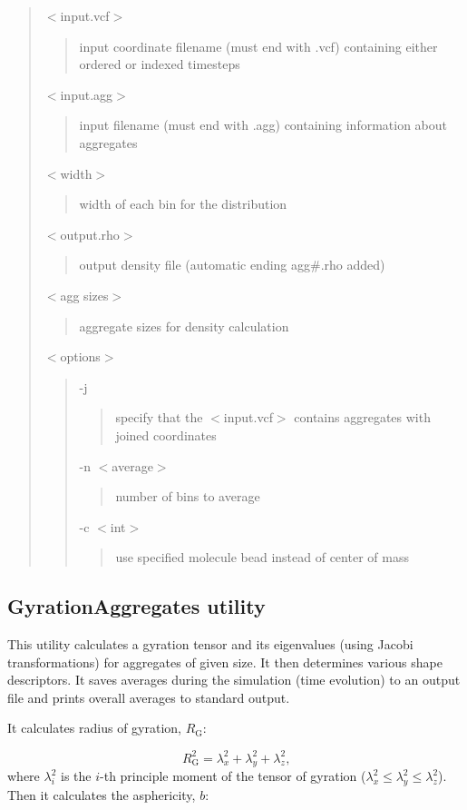 \begin{quote}
{\ttfamily $<$input.\+vcf$>$} \begin{quote}
input coordinate filename (must end with {\ttfamily .vcf}) containing either ordered or indexed timesteps \end{quote}
{\ttfamily $<$input.\+agg$>$} \begin{quote}
input filename (must end with {\ttfamily .agg}) containing information about aggregates \end{quote}
{\ttfamily $<$width$>$} \begin{quote}
width of each bin for the distribution \end{quote}
{\ttfamily $<$output.\+rho$>$} \begin{quote}
output density file (automatic ending {\ttfamily agg\#.rho} added) \end{quote}
{\ttfamily $<$agg sizes$>$} \begin{quote}
aggregate sizes for density calculation \end{quote}
{\ttfamily $<$options$>$} \begin{quote}
{\ttfamily -\/j} \begin{quote}
specify that the {\ttfamily $<$input.\+vcf$>$} contains aggregates with joined coordinates \end{quote}
{\ttfamily -\/n $<$average$>$} \begin{quote}
number of bins to average \end{quote}
{\ttfamily -\/c $<$int$>$} \begin{quote}
use specified molecule bead instead of center of mass \end{quote}
\end{quote}
\end{quote}
\hypertarget{Common_GyrationAggregates}{}\subsection{Gyration\+Aggregates utility}\label{Common_GyrationAggregates}
This utility calculates a gyration tensor and its eigenvalues (using Jacobi transformations) for aggregates of given size. It then determines various shape descriptors. It saves averages during the simulation (time evolution) to an output file and prints overall averages to standard output.

It calculates radius of gyration, $R_{\mathrm{G}}$:

\begin{equation}
  R_{\mathrm{G}}^2 = \lambda_x^2 + \lambda_y^2 + \lambda_z^2 \mbox{,}
\end{equation} where $\lambda_i^2$ is the $i$-th principle moment of the tensor
of gyration ($\lambda_x^2 \leq \lambda_y^2 \leq \lambda_z^2$).
Then it calculates the asphericity, $b$:

